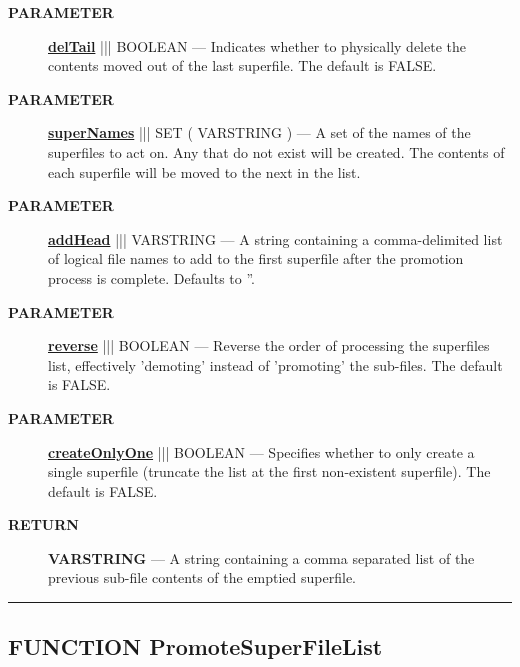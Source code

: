 \par
\begin{description}
\item [\colorbox{tagtype}{\color{white} \textbf{\textsf{PARAMETER}}}] \textbf{\underline{delTail}} ||| BOOLEAN --- Indicates whether to physically delete the contents moved out of the last superfile. The default is FALSE.
\item [\colorbox{tagtype}{\color{white} \textbf{\textsf{PARAMETER}}}] \textbf{\underline{superNames}} ||| SET ( VARSTRING ) --- A set of the names of the superfiles to act on. Any that do not exist will be created. The contents of each superfile will be moved to the next in the list.
\item [\colorbox{tagtype}{\color{white} \textbf{\textsf{PARAMETER}}}] \textbf{\underline{addHead}} ||| VARSTRING --- A string containing a comma-delimited list of logical file names to add to the first superfile after the promotion process is complete. Defaults to ''.
\item [\colorbox{tagtype}{\color{white} \textbf{\textsf{PARAMETER}}}] \textbf{\underline{reverse}} ||| BOOLEAN --- Reverse the order of processing the superfiles list, effectively 'demoting' instead of 'promoting' the sub-files. The default is FALSE.
\item [\colorbox{tagtype}{\color{white} \textbf{\textsf{PARAMETER}}}] \textbf{\underline{createOnlyOne}} ||| BOOLEAN --- Specifies whether to only create a single superfile (truncate the list at the first non-existent superfile). The default is FALSE.
\end{description}







\par
\begin{description}
\item [\colorbox{tagtype}{\color{white} \textbf{\textsf{RETURN}}}] \textbf{VARSTRING} --- A string containing a comma separated list of the previous sub-file contents of the emptied superfile.
\end{description}




\rule{\linewidth}{0.5pt}
\subsection*{\textsf{\colorbox{headtoc}{\color{white} FUNCTION}
PromoteSuperFileList}}

